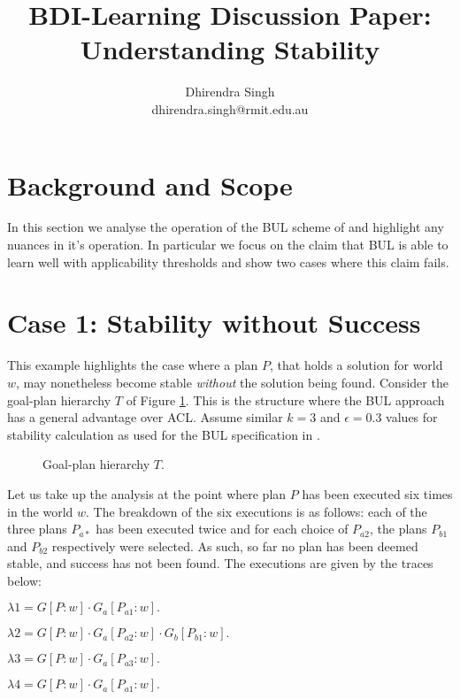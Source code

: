 \documentclass[a4paper]{article}
\title{BDI-Learning Discussion Paper:\\Understanding Stability}
\author{
Dhirendra Singh\\ 
dhirendra.singh@rmit.edu.au\\
}
\begin{document}
\maketitle

\section{Background and Scope}

In this section we analyse the operation of the BUL scheme of \cite{Singh:AAMAS10} and highlight any nuances in it's operation. In particular we focus on the claim that BUL is able to learn well with applicability thresholds and show two cases where this claim fails. 


\section{Case 1: Stability without Success}

This example highlights the case where a plan $P$, that holds a solution for world $w$, may nonetheless become stable \textit{without} the solution being found. Consider the goal-plan hierarchy $T$ of Figure \ref{fig:t}. This is the structure where the BUL approach has a general advantage over ACL. Assume similar $k=3$ and $\epsilon=0.3$ values for stability calculation as used for the BUL specification in \cite{Singh:AAMAS10}.

\begin{figure}[ht]
\begin{center}

\end{center}
\caption{Goal-plan hierarchy $T$.}
\label{fig:t}
\end{figure}

Let us take up the analysis at the point where plan $P$ has been executed six times in the world $w$. The breakdown of the six executions is as follows: each of the three plans $P_{a*}$ has been executed twice and for each choice of $P_{a2}$, the plans $P_{b1}$ and $P_{b2}$ respectively were selected. As such, so far no plan has been deemed stable, and success has not been found. The executions are given by the traces below:

$\lambda1 = G[P:w] \cdot G_a[P_{a1}:w].$

$\lambda2 = G[P:w] \cdot G_a[P_{a2}:w] \cdot G_b[P_{b1}:w].$

$\lambda3 = G[P:w] \cdot G_a[P_{a3}:w].$

$\lambda4 = G[P:w] \cdot G_a[P_{a1}:w].$
\end{document}
